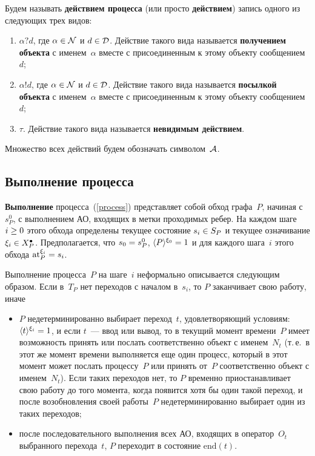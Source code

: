 \begin{multicols}{2}
Будем называть {\bf действием процесса} (или просто {\bf действием})
запись одного из следующих трех видов:
\begin{enumerate}[($i$)]
\item $\alpha?d$, где $\alpha\hm\in {\cal N}$ и $d\hm\in {\cal D}$.
Действие такого вида называется {\bf получением объекта} с именем~$\alpha$
вместе с присоединенным к этому объекту сообщением~$d$;

\item $\alpha!d$, где $\alpha\hm\in {\cal N}$ и $d\hm\in {\cal D}$.
Действие такого вида называется {\bf посылкой
объекта} с именем~$\alpha$ вместе с присоединенным к этому объекту сообщением~$d$;

\item $\tau$.
Действие такого вида называется {\bf невидимым действием}.
\end{enumerate}

Множество всех действий будем обозначать символом~${\cal A}$.

\subsection{Выполнение процесса}

{\bf Выполнение} процесса~(\ref{process})
представляет собой обход графа~$P$,
начиная с~$s^0_P$, с выполнением АО, входящих в метки проходимых ребер.
На каждом шаге $i\hm\geq 0$ этого обхода определены текущее состояние $s_i\hm\in S_P$
и текущее означивание $\xi_i \hm\in X_P^\bullet$.
Предполагается, что $s_0\hm= s^0_P$,
$\langle{P}\rangle^{\xi_0} \hm= 1$ и для каждого шага~$i$ этого обхода
$\mathrm{at}_P^{\xi_i} \hm= s_i$.

Выполнение процесса~$P$ на шаге~$i$ неформально описывается
следующим образом. Если в~$T_P$ нет переходов с началом в~$s_i$, то
$P$ заканчивает свою работу, иначе
\begin{itemize}
\item $P$ недетерминированно выбирает переход~$t$,
удовлетворяющий условиям: $\langle{t}\rangle^{\xi_i}\hm=1$, и
если $t$~--- ввод или вывод, то в текущий момент времени~$P$ имеет
возможность принять  или послать соответственно объект с именем~$N_t$
(т.\,е.\ в этот  же момент времени выполняется еще один процесс,
который в этот момент может послать процессу~$P$ или принять  от~$P$
соответственно объект  с именем~$N_t$). Если таких переходов нет,
      то  $P$  временно приостанавливает свою работу до
      того момента, когда появится хотя бы один такой переход, и после возобновления своей
      работы~$P$ недетерминированно выбирает один из
таких переходов;
\item после последовательного выполнения всех АО,
входящих в оператор~$O_t$ выбранного перехода~$t$, $P$
переходит в состояние $\mathrm{end}\left(t\right)$.
\end{itemize}


\end{multicols}
